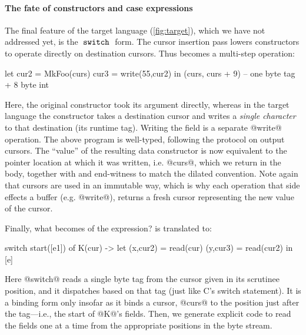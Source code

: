\documentclass[a4paper,english]{lipics-v2016}
\begin{document}


\paragraph*{The fate of constructors and case expressions}

The final feature of the target language (\cref{fig:target}), which we have not
addressed yet, is the $\; \texttt{switch} \;$ form.
%
The cursor insertion pass lowers constructors to operate directly on destination
cursors.  Thus  becomes a multi-step operation:

\begin{code}
  let cur2 = MkFoo(curs)
      cur3 = write(55,cur2)
  in (curs, curs + 9) -- one byte tag + 8 byte int
\end{code}

Here, the original constructor took its argument directly, whereas in the target
language the constructor takes a destination cursor and writes a {\em single
  character} to that destination (its runtime tag).  Writing the field is a
separate @write@ operation.
%
The above program is well-typed, following the protocol on output cursors.
%
The ``value'' of the resulting data constructor is now equivalent to the pointer
location at which it was written, i.e. @curs@, which we return in the body,
together with and end-witness to match the dilated convention.
%
Note again that cursors are used in an immutable way, which is why each
operation that side effects a buffer (e.g. @write@), returns a fresh cursor
representing the new value of the cursor.

Finally, what becomes of the  expression?   is
translated to:

\begin{code}
  switch start([e1]) of
    K(cur) -> let (x,cur2) = read(cur)
                  (y,cur3) = read(cur2)
              in [e]
\end{code}

Here @switch@ reads a single byte tag from the cursor given in its scrutinee
position, and it dispatches based on that tag (just like C's switch statement).
It is a binding form only insofar as it binds a cursor, @curs@ to the position
just after the tag---i.e., the start of @K@'s fields.  Then, we generate
explicit code to read the fields one at a time from the appropriate positions in
the byte stream.
\end{document}
